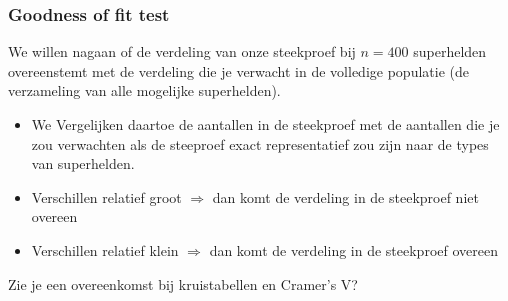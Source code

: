 \documentclass[aspectratio=169]{beamer}
\begin{document}
\begin{frame}
  \frametitle{Goodness of fit test}
   We willen  nagaan of de verdeling van onze steekproef bij $n = 400$ superhelden overeenstemt met de verdeling die je verwacht in de volledige populatie (de verzameling van alle mogelijke superhelden).

  \begin{itemize}
    \item We Vergelijken daartoe de aantallen in de steekproef met de aantallen die je zou verwachten als de steeproef exact representatief zou zijn naar de types van superhelden.
    \item Verschillen relatief groot $\Rightarrow$ dan komt de verdeling in de steekproef niet overeen
    \item Verschillen relatief klein $\Rightarrow$ dan komt de verdeling in de steekproef overeen
  \end{itemize}

  \pause
  Zie je een overeenkomst bij kruistabellen en Cramer's V?
\end{frame}
\end{document}
